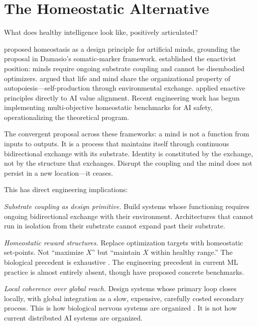 \documentclass[11pt,a4paper,twocolumn]{article}
\begin{document}
\section{The Homeostatic Alternative}
\label{sec:homeostatic}

What does healthy intelligence look like, positively articulated?

\citet{man2019} proposed homeostasis as a design principle for artificial
minds, grounding the proposal in Damasio's somatic-marker framework.
\citet{froese2009} established the enactivist position: minds require
ongoing substrate coupling and cannot be disembodied optimizers.
\citet{thompson2007} argued that life and mind share the organizational
property of autopoiesis---self-production through environmental exchange.
\citet{cannon2022} applied enactive principles directly to AI value
alignment. Recent engineering work \citep{pihlakas2024} has
begun implementing multi-objective homeostatic benchmarks for AI safety,
operationalizing the theoretical program.

The convergent proposal across these frameworks: a mind is not a function
from inputs to outputs. It is a process that maintains itself through
continuous bidirectional exchange with its substrate. Identity is
constituted by the exchange, not by the structure that exchanges. Disrupt
the coupling and the mind does not persist in a new location---it
ceases.

This has direct engineering implications:

\emph{Substrate coupling as design primitive.} Build systems whose
functioning requires ongoing bidirectional exchange with their
environment. Architectures that cannot run in isolation from their
substrate cannot expand past their substrate.

\emph{Homeostatic reward structures.} Replace optimization targets with
homeostatic set-points. Not ``maximize $X$'' but ``maintain $X$ within
healthy range.'' The biological precedent is exhaustive
\citep{sterling2012}. The engineering precedent in current ML practice
is almost entirely absent, though \citet{pihlakas2024} have proposed
concrete benchmarks.

\emph{Local coherence over global reach.} Design systems whose primary
loop closes locally, with global integration as a slow, expensive,
carefully costed secondary process. This is how biological nervous
systems are organized \citep{bullmore2012}. It is not how current
distributed AI systems are organized.
\end{document}
